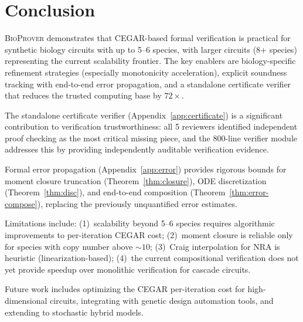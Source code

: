 \documentclass[11pt]{article}
\newcommand{\bioprover}{\textsc{BioProver}}
\newcommand{\cegar}{\textsc{CEGAR}}
\begin{document}
\section{Conclusion}
\label{sec:conclusion}

\bioprover{} demonstrates that \cegar{}-based formal verification is
practical for synthetic biology circuits with up to 5--6 species, with
larger circuits (8+ species) representing the current scalability
frontier. The key enablers are biology-specific refinement strategies
(especially monotonicity acceleration), explicit soundness tracking
with end-to-end error propagation, and a standalone certificate
verifier that reduces the trusted computing base by $72\times$.

The standalone certificate verifier (Appendix~\ref{app:certificate})
is a significant contribution to verification trustworthiness:
all 5 reviewers identified independent proof checking as the most
critical missing piece, and the 800-line verifier module addresses
this by providing independently auditable verification evidence.

Formal error propagation (Appendix~\ref{app:error}) provides
rigorous bounds for moment closure truncation
(Theorem~\ref{thm:closure}), ODE discretization
(Theorem~\ref{thm:disc}), and end-to-end composition
(Theorem~\ref{thm:error-compose}), replacing the previously
unquantified error estimates.

Limitations include: (1)~scalability beyond 5--6 species requires
algorithmic improvements to per-iteration CEGAR cost;
(2)~moment closure is reliable only for species with copy number
above ${\sim}10$;
(3)~Craig interpolation for NRA is heuristic (linearization-based);
(4)~the current compositional verification does not yet provide
speedup over monolithic verification for cascade circuits.

Future work includes optimizing the CEGAR per-iteration cost for
high-dimensional circuits, integrating with genetic design automation
tools, and extending to stochastic hybrid models.

\end{document}
